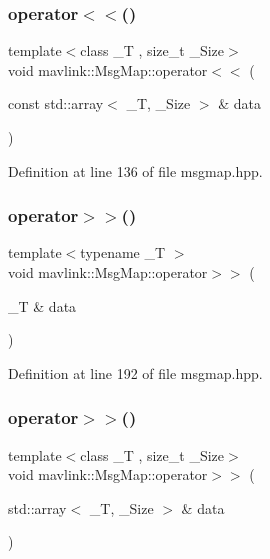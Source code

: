\mbox{\label{classmavlink_1_1MsgMap_aa79388f240280cc4848a63ce0a82073e}} 
\subsubsection{\texorpdfstring{operator$<$$<$()}{operator<<()}\hspace{0.1cm}{\footnotesize\ttfamily [2/2]}}
{\footnotesize\ttfamily template$<$class \+\_\+T , size\+\_\+t \+\_\+\+Size$>$ \\
void mavlink\+::\+Msg\+Map\+::operator$<$$<$ (\begin{DoxyParamCaption}\item[{const std\+::array$<$ \+\_\+T, \+\_\+\+Size $>$ \&}]{data }\end{DoxyParamCaption})}



Definition at line 136 of file msgmap.\+hpp.

\mbox{\label{classmavlink_1_1MsgMap_ada013c1d270ab080a6a11a60c67519d6}} 
\subsubsection{\texorpdfstring{operator$>$$>$()}{operator>>()}\hspace{0.1cm}{\footnotesize\ttfamily [1/2]}}
{\footnotesize\ttfamily template$<$typename \+\_\+T $>$ \\
void mavlink\+::\+Msg\+Map\+::operator$>$$>$ (\begin{DoxyParamCaption}\item[{\+\_\+T \&}]{data }\end{DoxyParamCaption})}



Definition at line 192 of file msgmap.\+hpp.

\mbox{\label{classmavlink_1_1MsgMap_a3e446ddceb5afa98cfdf86fcbe20b30d}} 
\subsubsection{\texorpdfstring{operator$>$$>$()}{operator>>()}\hspace{0.1cm}{\footnotesize\ttfamily [2/2]}}
{\footnotesize\ttfamily template$<$class \+\_\+T , size\+\_\+t \+\_\+\+Size$>$ \\
void mavlink\+::\+Msg\+Map\+::operator$>$$>$ (\begin{DoxyParamCaption}\item[{std\+::array$<$ \+\_\+T, \+\_\+\+Size $>$ \&}]{data }\end{DoxyParamCaption})}



